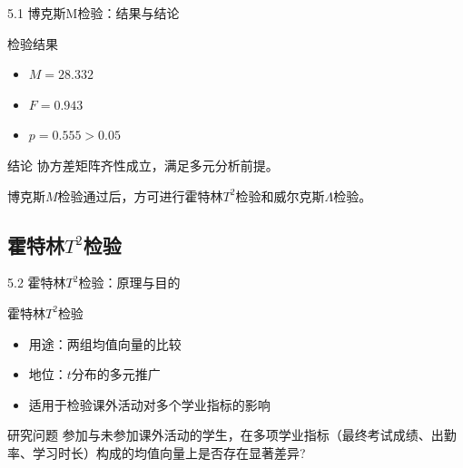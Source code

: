 \documentclass{beamer}
\newenvironment{block*}
  {\setbeamercolor{block title}{bg=white,fg=white}%
   \begin{block}{}}
  {\end{block}}
\begin{document}
\begin{frame}{5.1 博克斯M检验：结果与结论}
    \begin{block}{检验结果}
        \begin{itemize}
            \item \(M = 28.332\)
            \item \(F = 0.943\)
            \item \(p = 0.555 > 0.05\)
        \end{itemize}
    \end{block}

    \vspace{0.5cm}

    \begin{alertblock}{结论}
        协方差矩阵齐性成立，满足多元分析前提。
    \end{alertblock}

    \vspace{0.3cm}

    \begin{block*}
        博克斯\(M\)检验通过后，方可进行霍特林\(T^2\)检验和威尔克斯\(\Lambda\)检验。
    \end{block*}
\end{frame}

\subsection{霍特林\(T^2\)检验}
\begin{frame}{5.2 霍特林\(T^2\)检验：原理与目的}
    \begin{block}{霍特林\(T^2\)检验}
        \begin{itemize}
            \item 用途：两组均值向量的比较
            \item 地位：\(t\)分布的多元推广
            \item 适用于检验课外活动对多个学业指标的影响
        \end{itemize}
    \end{block}

    \vspace{0.5cm}

    \begin{block}{研究问题}
        参加与未参加课外活动的学生，在多项学业指标（最终考试成绩、出勤率、学习时长）构成的均值向量上是否存在显著差异?
    \end{block}
\end{frame}
\end{document}
